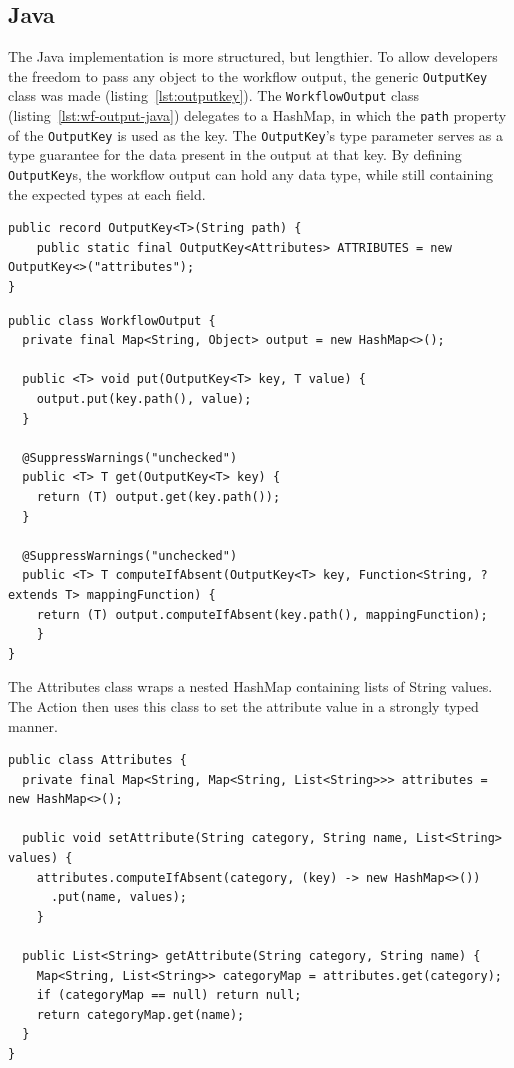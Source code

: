 \subsection{Java}
The Java implementation is more structured, but lengthier. To allow developers the freedom to pass any object to the workflow output, the generic \texttt{OutputKey} class was made (listing~\ref{lst:outputkey}). The \texttt{WorkflowOutput} class (listing~\ref{lst:wf-output-java}) delegates to a HashMap, in which the \texttt{path} property of the \texttt{OutputKey} is used as the key. The \texttt{OutputKey}'s type parameter serves as a type guarantee for the data present in the output at that key. By defining \texttt{OutputKey}s, the workflow output can hold any data type, while still containing the expected types at each field.
\begin{listing}[H]
\begin{verbatim}
public record OutputKey<T>(String path) {
    public static final OutputKey<Attributes> ATTRIBUTES = new OutputKey<>("attributes");
}
\end{verbatim}
\caption{\label{lst:outputkey}The \texttt{OutputKey} class in Java}
\end{listing}

\begin{listing}[H]
\begin{verbatim}
public class WorkflowOutput {
  private final Map<String, Object> output = new HashMap<>();

  public <T> void put(OutputKey<T> key, T value) {
    output.put(key.path(), value);
  }

  @SuppressWarnings("unchecked")
  public <T> T get(OutputKey<T> key) {
    return (T) output.get(key.path());
  }

  @SuppressWarnings("unchecked")
  public <T> T computeIfAbsent(OutputKey<T> key, Function<String, ? extends T> mappingFunction) {
    return (T) output.computeIfAbsent(key.path(), mappingFunction);
    }
}
\end{verbatim}
\caption{\label{lst:wf-output-java}The \texttt{WorkflowOutput} class in Java}
\end{listing}
The Attributes class wraps a nested HashMap containing lists of String values. The Action then uses this class to set the attribute value in a strongly typed manner.
\begin{listing}[H]
\begin{verbatim}
public class Attributes {
  private final Map<String, Map<String, List<String>>> attributes = new HashMap<>();

  public void setAttribute(String category, String name, List<String> values) {
    attributes.computeIfAbsent(category, (key) -> new HashMap<>())
      .put(name, values);
    }

  public List<String> getAttribute(String category, String name) {
    Map<String, List<String>> categoryMap = attributes.get(category);
    if (categoryMap == null) return null;
    return categoryMap.get(name);
  }
}
\end{verbatim}
\caption{Attributes class in Java}
\end{listing}

